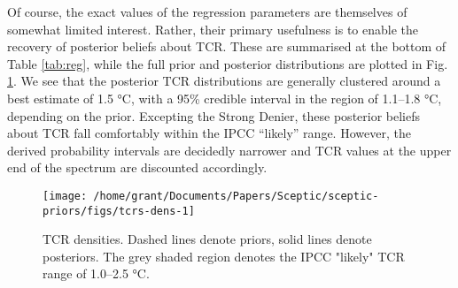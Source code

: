 \documentclass[smallextended]{svjour3}       %
\begin{document}
\begin{table}
\begin{threeparttable}
\begin{tablenotes}[para]
\end{tablenotes}
\end{threeparttable}
\end{table}

Of course, the exact values of the regression parameters are themselves
of somewhat limited interest. Rather, their primary usefulness is to
enable the recovery of posterior beliefs about TCR. These are summarised
at the bottom of Table \ref{tab:reg}, while the full prior and posterior
distributions are plotted in Fig. \ref{fig:tcrs-dens}. We see that the
posterior TCR distributions are generally clustered around a best
estimate of 1.5 °C, with a 95\% credible interval in the region of
1.1--1.8 °C, depending on the prior. Excepting the Strong Denier, these
posterior beliefs about TCR fall comfortably within the IPCC ``likely''
range. However, the derived probability intervals are decidedly narrower
and TCR values at the upper end of the spectrum are discounted
accordingly.

\begin{figure}

{\centering \texttt{[image: /home/grant/Documents/Papers/Sceptic/sceptic-priors/figs/tcrs-dens-1]} 

}

\caption{TCR densities. Dashed lines denote priors, solid lines denote posteriors. The grey shaded region denotes the IPCC "likely" TCR range of 1.0--2.5 °C.}\label{fig:tcrs-dens}
\end{figure}
\end{document}
